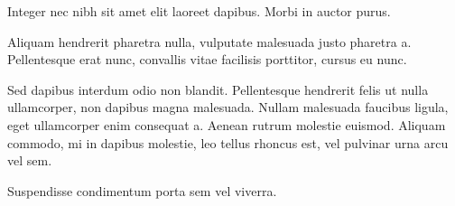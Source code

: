 \noindent
Integer nec nibh sit amet elit laoreet dapibus. Morbi in auctor purus.

Aliquam hendrerit pharetra nulla, vulputate malesuada justo pharetra a. Pellentesque erat nunc, convallis vitae facilisis porttitor, cursus eu nunc.

Sed dapibus interdum odio non blandit. Pellentesque hendrerit felis ut nulla ullamcorper, non dapibus magna malesuada. Nullam malesuada faucibus ligula, eget ullamcorper enim consequat a. Aenean rutrum molestie euismod. Aliquam commodo, mi in dapibus molestie, leo tellus rhoncus est, vel pulvinar urna arcu vel sem.

Suspendisse condimentum porta sem vel viverra.
